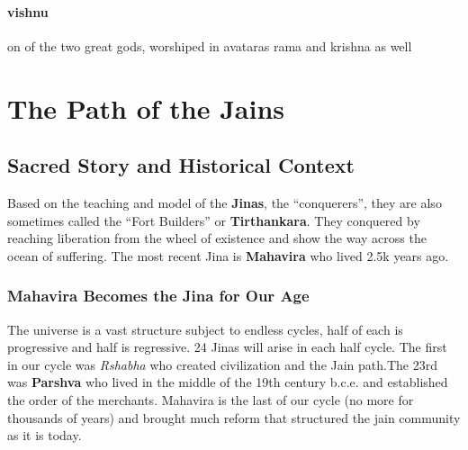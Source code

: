 \documentclass{article}
\begin{document}
\paragraph{vishnu}
\label{par:vishnu}
on of the two great gods, worshiped in avataras rama and krishna as well

\section*{The Path of the Jains}
\label{sec:the_path_of_the_jains}
\subsection*{Sacred Story and Historical Context}
\label{sub:sacred_story_and_historical_context}
Based on the teaching and model of the \textbf{Jinas}, the ``conquerers'', they are also sometimes called the ``Fort Builders'' or \textbf{Tirthankara}. They conquered by reaching liberation from the wheel of existence and show the way across the ocean of suffering. The most recent Jina is \textbf{Mahavira} who lived 2.5k years ago.

\subsubsection*{Mahavira Becomes the Jina for Our Age}
\label{ssub:mahavira_becomes_the_jina_for_our_age}
The universe is a vast structure subject to endless cycles, half of each is progressive and half is regressive. 24 Jinas will arise in each half cycle. The first in our cycle was \emph{Rshabha} who created civilization and the Jain path.The 23rd was \textbf{Parshva} who lived in the middle of the 19th century b.c.e. and established the order of the merchants. Mahavira is the last of our cycle (no more for thousands of years) and brought much reform that structured the jain community as it is today.
\end{document}

